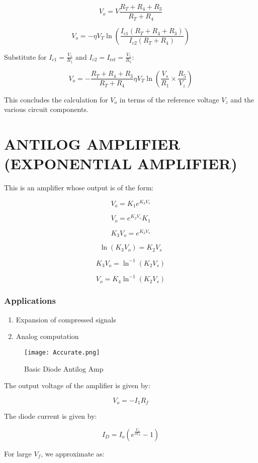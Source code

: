 \documentclass[a4paper,9pt,twoside,openany,twocolumn]{memoir}
\begin{document}
\[
V_o = V \frac{R_T + R_4 + R_3}{R_T + R_4} \tag{17}
\]

\[
V_o = -\eta V_T \ln \left( \frac{I_{c1} \left( R_T + R_4 + R_3 \right)}{I_{c2} \left( R_T + R_4 \right)} \right) \tag{18}
\]

Substitute for \( I_{c1} = \frac{V_s}{R_1} \) and \( I_{c2} = I_{\text{ref}} = \frac{V_z}{R_5} \):

\[
V_o = -\frac{R_T + R_4 + R_3}{R_T + R_4} \eta V_T \ln \left( \frac{V_s}{R_1} \times \frac{R_5}{V_z} \right) \tag{19}
\]

This concludes the calculation for \( V_o \) in terms of the reference voltage \( V_z \) and the various circuit components.

\chapter{ANTILOG AMPLIFIER (EXPONENTIAL AMPLIFIER)}
This is an amplifier whose output is of the form:

\[
V_o = K_1 e^{K_2 V_s}
\]

\[
V_o = e^{K_2 V_s} K_1
\]

\[
K_3 V_o = e^{K_2 V_s}
\]

\[
\ln(K_3 V_o) = K_2 V_s
\]

\[
K_3 V_o = \ln^{-1}(K_2 V_s)
\]

\[
V_o = K_4 \ln^{-1}(K_2 V_s)
\]

\subsection*{Applications}

\begin{enumerate}
    \item Expansion of compressed signals
    \item Analog computation
\end{enumerate}
\begin{figure}[H]
    \centering
    \texttt{[image: Accurate.png]}
    \caption{Basic Diode Antilog Amp}
    \label{fig:question_image}
\end{figure}

The output voltage of the amplifier is given by:

\[
V_o = - I_1 R_f \tag{1}
\]

The diode current is given by:

\[
I_D = I_o \left( e^{\frac{V_f}{\eta V_T}} - 1 \right) \tag{2}
\]

For large \( V_f \), we approximate as:
\end{document}
